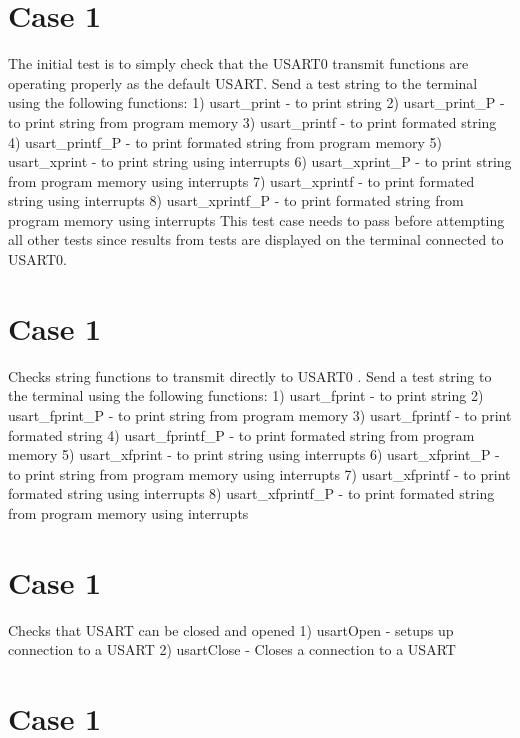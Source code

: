 \hypertarget{index_Test}{}\section{Case 1}\label{index_Test}
The initial test is to simply check that the U\+S\+A\+R\+T0 transmit functions are operating properly as the default U\+S\+A\+R\+T. Send a test string to the terminal using the following functions\+: 1) usart\+\_\+print -\/ to print string 2) usart\+\_\+print\+\_\+\+P -\/ to print string from program memory 3) usart\+\_\+printf -\/ to print formated string 4) usart\+\_\+printf\+\_\+\+P -\/ to print formated string from program memory 5) usart\+\_\+xprint -\/ to print string using interrupts 6) usart\+\_\+xprint\+\_\+\+P -\/ to print string from program memory using interrupts 7) usart\+\_\+xprintf -\/ to print formated string using interrupts 8) usart\+\_\+xprintf\+\_\+\+P -\/ to print formated string from program memory using interrupts This test case needs to pass before attempting all other tests since results from tests are displayed on the terminal connected to U\+S\+A\+R\+T0.\hypertarget{index_Test}{}\section{Case 1}\label{index_Test}
Checks string functions to transmit directly to U\+S\+A\+R\+T0 . Send a test string to the terminal using the following functions\+: 1) usart\+\_\+fprint -\/ to print string 2) usart\+\_\+fprint\+\_\+\+P -\/ to print string from program memory 3) usart\+\_\+fprintf -\/ to print formated string 4) usart\+\_\+fprintf\+\_\+\+P -\/ to print formated string from program memory 5) usart\+\_\+xfprint -\/ to print string using interrupts 6) usart\+\_\+xfprint\+\_\+\+P -\/ to print string from program memory using interrupts 7) usart\+\_\+xfprintf -\/ to print formated string using interrupts 8) usart\+\_\+xfprintf\+\_\+\+P -\/ to print formated string from program memory using interrupts\hypertarget{index_Test}{}\section{Case 1}\label{index_Test}
Checks that U\+S\+A\+R\+T can be closed and opened 1) usart\+Open -\/ setups up connection to a U\+S\+A\+R\+T 2) usart\+Close -\/ Closes a connection to a U\+S\+A\+R\+T\hypertarget{index_Test}{}\section{Case 1}\label{index_Test}
